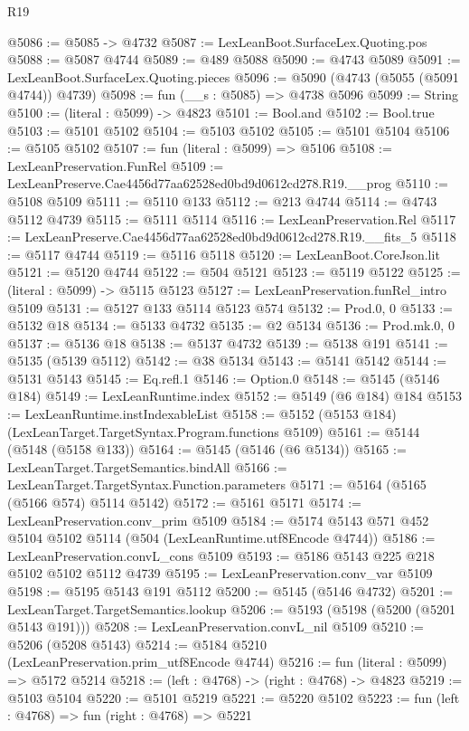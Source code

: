 \begin{lexlean}{R19}
\begin{coremodule}
{{{{{{{{{{{@5086 := @5085 -> @4732
@5087 := LexLeanBoot.SurfaceLex.Quoting.pos
@5088 := @5087 @4744
@5089 := @489 @5088
@5090 := @4743 @5089
@5091 := LexLeanBoot.SurfaceLex.Quoting.pieces
@5096 := @5090 (@4743 (@5055 (@5091 @4744)) @4739)
@5098 := fun (__s : @5085) => @4738 @5096
@5099 := String
@5100 := (literal : @5099) -> @4823
@5101 := Bool.and
@5102 := Bool.true
@5103 := @5101 @5102
@5104 := @5103 @5102
@5105 := @5101 @5104
@5106 := @5105 @5102
@5107 := fun (literal : @5099) => @5106
@5108 := LexLeanPreservation.FunRel
@5109 := LexLeanPreserve.Cae4456d77aa62528ed0bd9d0612cd278.R19.__prog
@5110 := @5108 @5109
@5111 := @5110 @133
@5112 := @213 @4744
@5114 := @4743 @5112 @4739
@5115 := @5111 @5114
@5116 := LexLeanPreservation.Rel
@5117 := LexLeanPreserve.Cae4456d77aa62528ed0bd9d0612cd278.R19.__fits_5
@5118 := @5117 @4744
@5119 := @5116 @5118
@5120 := LexLeanBoot.CoreJson.lit
@5121 := @5120 @4744
@5122 := @504 @5121
@5123 := @5119 @5122
@5125 := (literal : @5099) -> @5115 @5123
@5127 := LexLeanPreservation.funRel_intro @5109
@5131 := @5127 @133 @5114 @5123 @574
@5132 := Prod.{0, 0}
@5133 := @5132 @18
@5134 := @5133 @4732
@5135 := @2 @5134
@5136 := Prod.mk.{0, 0}
@5137 := @5136 @18
@5138 := @5137 @4732
@5139 := @5138 @191
@5141 := @5135 (@5139 @5112)
@5142 := @38 @5134
@5143 := @5141 @5142
@5144 := @5131 @5143
@5145 := Eq.refl.{1}
@5146 := Option.{0}
@5148 := @5145 (@5146 @184)
@5149 := LexLeanRuntime.index
@5152 := @5149 (@6 @184) @184
@5153 := LexLeanRuntime.instIndexableList
@5158 := @5152 (@5153 @184) (LexLeanTarget.TargetSyntax.Program.functions @5109)
@5161 := @5144 (@5148 (@5158 @133))
@5164 := @5145 (@5146 (@6 @5134))
@5165 := LexLeanTarget.TargetSemantics.bindAll
@5166 := LexLeanTarget.TargetSyntax.Function.parameters
@5171 := @5164 (@5165 (@5166 @574) @5114 @5142)
@5172 := @5161 @5171
@5174 := LexLeanPreservation.conv_prim @5109
@5184 := @5174 @5143 @571 @452 @5104 @5102 @5114 (@504 (LexLeanRuntime.utf8Encode @4744))
@5186 := LexLeanPreservation.convL_cons @5109
@5193 := @5186 @5143 @225 @218 @5102 @5102 @5112 @4739
@5195 := LexLeanPreservation.conv_var @5109
@5198 := @5195 @5143 @191 @5112
@5200 := @5145 (@5146 @4732)
@5201 := LexLeanTarget.TargetSemantics.lookup
@5206 := @5193 (@5198 (@5200 (@5201 @5143 @191)))
@5208 := LexLeanPreservation.convL_nil @5109
@5210 := @5206 (@5208 @5143)
@5214 := @5184 @5210 (LexLeanPreservation.prim_utf8Encode @4744)
@5216 := fun (literal : @5099) => @5172 @5214
@5218 := (left : @4768) -> (right : @4768) -> @4823
@5219 := @5103 @5104
@5220 := @5101 @5219
@5221 := @5220 @5102
@5223 := fun (left : @4768) => fun (right : @4768) => @5221
}}}}}}}}}}}
\end{coremodule}
\end{lexlean}
